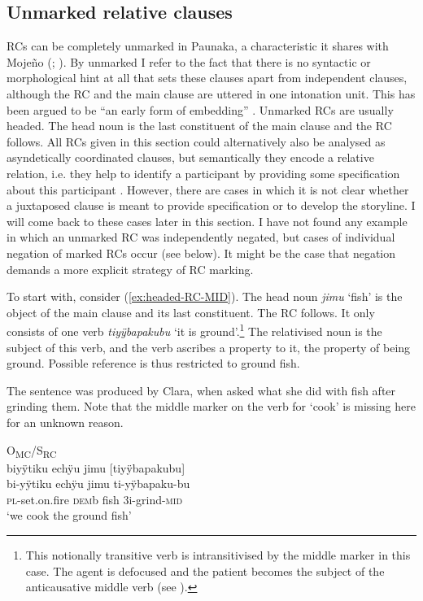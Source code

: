 \subsection{Unmarked relative clauses}\label{sec:UnmarkedRC}

RCs can be completely unmarked in Paunaka, a characteristic it shares with Mojeño (\citealp[cf.][596--597]{OlzaZubiri2004}; \citealt[92]{Rose2014a}). By unmarked I refer to the fact that there is no syntactic or morphological hint at all that sets these clauses apart from independent clauses, although the RC and the main clause are uttered in one intonation unit. This has been argued to be “an early form of embedding” \citep[6]{Givon2012}. Unmarked RCs are usually headed. The head noun is the last constituent of the main clause and the RC follows. All RCs given in this section could alternatively also be analysed as asyndetically coordinated clauses, but semantically they encode a relative relation, i.e. they help to identify a participant by providing some specification about this participant \citep[195]{Cristofaro2003}. However, there are cases in which it is not clear whether a juxtaposed clause is meant to provide specification or to develop the storyline. I will come back to these cases later in this section. I have not found any example in which an unmarked RC was independently negated, but cases of individual negation of marked RCs occur (see  below). It might be the case that negation demands a more explicit strategy of RC marking.

To start with, consider (\ref{ex:headed-RC-MID}). The head noun \textit{jimu} ‘fish’ is the object of the main clause and its last constituent. The RC follows. It only consists of one verb \textit{tiyÿbapakubu} ‘it is ground’.\footnote{This notionally transitive verb is intransitivised by the middle marker in this case. The agent is defocused and the patient becomes the subject of the anticausative middle verb (see ).} The relativised noun is the subject of this verb, and the verb ascribes a property to it, the property of being ground. Possible reference is thus restricted to ground fish.

The sentence was produced by Clara, when asked what she did with fish after grinding them. Note that the middle marker on the verb for ‘cook’ is missing here for an unknown reason.

\ea\label{ex:headed-RC-MID}
\begingl
\glpreamble  \textup{O\textsubscript{MC}/S\textsubscript{RC}}\\biyÿtiku echÿu jimu \textup{[}tiyÿbapakubu\textup{]}\\
\gla bi-yÿtiku echÿu jimu ti-yÿbapaku-bu\\
\textsc{pl}-set.on.fire \textsc{dem}b fish 3i-grind-\textsc{mid}\\
\glft ‘we cook the ground fish’
\endgl
\trailingcitation{[cux-c120414ls-2.168]}
\xe

